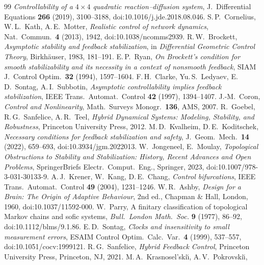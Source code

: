 \documentclass[11pt,reqno]{amsart}
\theoremstyle{plain}
\theoremstyle{remark}
\theoremstyle{definition}
\begin{document}
{\begin{thebibliography}{99}
  \emph{Controllability of a $4\times4$ quadratic reaction--diffusion system}, J.\ Differential Equations
  \textbf{266} (2019), 3100--3188, doi:10.1016/j.jde.2018.08.046.
 S.\,P.~Cornelius, W.\,L.~Kath, A.\,E.~Motter,
  \emph{Realistic control of network dynamics}, Nat.\ Commun.\ \textbf{4} (2013), 1942, doi:10.1038/ncomms2939.
 R.\,W.~Brockett,
  \emph{Asymptotic stability and feedback stabilization}, in
  \emph{Differential Geometric Control Theory}, Birkh\"auser, 1983, 181--191.
 E.\,P.~Ryan,
  \emph{On Brockett's condition for smooth stabilizability and its necessity in a context of
  nonsmooth feedback}, SIAM J.\ Control Optim.\ \textbf{32} (1994), 1597--1604.
 F.\,H.~Clarke, Yu.\,S.~Ledyaev, E.\,D.~Sontag, A.\,I.~Subbotin,
  \emph{Asymptotic controllability implies feedback stabilization},
  IEEE Trans.\ Automat.\ Control \textbf{42} (1997), 1394--1407.
 J.-M.~Coron,
  \emph{Control and Nonlinearity}, Math.\ Surveys Monogr.\ \textbf{136}, AMS, 2007.
 R.~Goebel, R.\,G.~Sanfelice, A.\,R.~Teel,
  \emph{Hybrid Dynamical Systems: Modeling, Stability, and Robustness}, Princeton University Press, 2012.
 M.\,D.~Kvalheim, D.\,E.~Koditschek,
  \emph{Necessary conditions for feedback stabilization and safety}, J.\ Geom.\ Mech.\ \textbf{14} (2022),
  659--693, doi:10.3934/jgm.2022013.
 W.~Jongeneel, E.~Moulay,
  \emph{Topological Obstructions to Stability and Stabilization: History, Recent Advances and Open Problems},
  SpringerBriefs Electr.\ Comput.\ Eng., Springer, 2023, doi:10.1007/978-3-031-30133-9.
 A.\,J.~Krener, W.~Kang, D.\,E.~Chang,
  \emph{Control bifurcations},
  IEEE Trans.\ Automat.\ Control \textbf{49} (2004), 1231--1246.
 W.\,R.~Ashby,
  \emph{Design for a Brain: The Origin of Adaptive Behaviour}, 2nd ed., Chapman \& Hall, London, 1960,
  doi:10.1037/11592-000.
 W.~Parry, A finitary classification of topological Markov chains and sofic systems,
  \emph{Bull.\ London Math.\ Soc.} \textbf{9} (1977), 86--92, doi:10.1112/blms/9.1.86.
 E.\,D.~Sontag,
  \emph{Clocks and insensitivity to small measurement errors}, ESAIM Control Optim.\ Calc.\ Var.\
  \textbf{4} (1999), 537--557, doi:10.1051/cocv:1999121.
 R.\,G.~Sanfelice,
  \emph{Hybrid Feedback Control}, Princeton University Press, Princeton, NJ, 2021.
\bibitem{KrasnoselskiiPokrovskii1989} M.\,A.~Krasnosel'ski\u{\i}, A.\,V.~Pokrovski\u{\i},

\end{thebibliography}}
\end{document}
